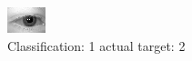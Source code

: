 \begin{figure}[h!]
\begin{center}
\includegraphics[width=0.60\columnwidth]{figures/ID400_class_1_target_2.png}
\end{center}
\caption{ Classification: 1 actual target: 2}
\label{fig:ID400_class_1_target_2}
\end{figure}
